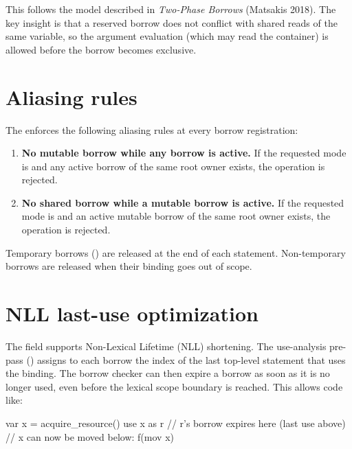 \pnum
This follows the model described in \textit{Two-Phase Borrows} (Matsakis 2018).
The key insight is that a reserved borrow does not conflict with shared reads
of the same variable, so the argument evaluation (which may read the container)
is allowed before the borrow becomes exclusive.

\section{Aliasing rules}
\label{sec:borrow-aliasing}

\pnum
The  enforces the following aliasing rules at every borrow
registration:

\begin{enumerate}
\item \textbf{No mutable borrow while any borrow is active.}  If the requested
  mode is  and any active borrow of the same root owner
  exists, the operation is rejected.
\item \textbf{No shared borrow while a mutable borrow is active.}  If the
  requested mode is  and an active mutable borrow of the
  same root owner exists, the operation is rejected.
\end{enumerate}

\pnum
Temporary borrows () are released at the end of
each statement.  Non-temporary borrows are released when their binding goes
out of scope.

\section{NLL last-use optimization}
\label{sec:borrow-nll}

\pnum
The  field supports Non-Lexical Lifetime (NLL)
shortening.  The use-analysis pre-pass ()
assigns to each borrow the index of the last top-level statement that uses the
binding.  The borrow checker can then expire a borrow as soon as it is no longer
used, even before the lexical scope boundary is reached.  This allows code like:

\begin{laincode}
var x = acquire_resource()
use x as r
// r's borrow expires here (last use above)
// x can now be moved below:
f(mov x)
\end{laincode}
